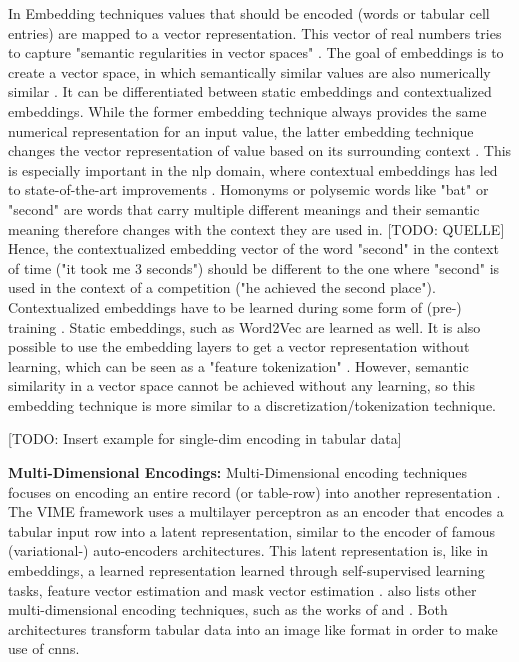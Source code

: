 In Embedding techniques values that should be encoded (\eg words or tabular cell entries) are mapped to a vector representation. 
This vector of real numbers tries to capture "semantic regularities in vector spaces" \cite[p. 2]{pilaluisa2022ContextualWordEmbeddings}.
The goal of embeddings is to create a vector space, in which semantically similar values are also numerically similar \cite{pilaluisa2022ContextualWordEmbeddings}.
It can be differentiated between static embeddings and contextualized embeddings. 
While the former embedding technique always provides the same numerical representation for an input value, the latter embedding technique changes the vector representation of value based on its surrounding context \cite{pilaluisa2022ContextualWordEmbeddings}.
This is especially important in the \gls{nlp} domain, where contextual embeddings has led to state-of-the-art improvements \cite{pilaluisa2022ContextualWordEmbeddings}.
Homonyms or polysemic words like "bat" or "second" are words that carry multiple different meanings and their semantic meaning therefore changes with the context they are used in. [TODO: QUELLE]
Hence, the contextualized embedding vector of the word "second" in the context of time (\eg "it took me 3 seconds") should be different to the one where "second" is used in the context of a competition (\eg "he achieved the second place").
Contextualized embeddings have to be learned during some form of (pre-) training \cite{devlin2019BERTPretrainingDeep, iida2021TABBIEPretrainedRepresentations, deng2021TURLTableUnderstanding}. 
Static embeddings, such as Word2Vec \cite{mikolov2013DistributedRepresentationsWords} are learned as well. 
It is also possible to use the embedding layers to get a vector representation without learning, which can be seen as a "feature tokenization" \cite{zheng2022DiffusionModelsMissing, gorishniy2021RevisitingDeepLearning}.
However, semantic similarity in a vector space cannot be achieved without any learning, so this embedding technique is more similar to a discretization/tokenization technique.

[TODO: Insert example for single-dim encoding in tabular data]

\textbf{Multi-Dimensional Encodings:}
Multi-Dimensional encoding techniques focuses on encoding an entire record (or table-row) into another representation \cite{borisov2022DeepNeuralNetworks}.
The VIME framework \cite{yoon2020VIMEExtendingSuccess} uses a multilayer perceptron as an encoder that encodes a tabular input row into a latent representation, 
similar to the encoder of famous (variational-) auto-encoders \cite{kingma2013AutoEncodingVariationalBayes} architectures.
This latent representation is, like in embeddings, a learned representation learned through self-supervised learning tasks, feature vector estimation and mask vector estimation \cite{yoon2020VIMEExtendingSuccess}.
\cite{borisov2022DeepNeuralNetworks} also lists other multi-dimensional encoding techniques, such as the works of \cite{zhu2021ConvertingTabularData} and \cite{sun2019supertml}.
Both architectures transform tabular data into an image like format in order to make use of \glspl{cnn}.


